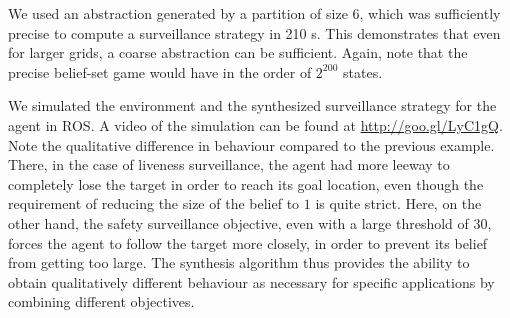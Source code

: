 We used an abstraction generated by a partition of size 6, which was sufficiently precise to compute a surveillance strategy in 210 s. This demonstrates that even for larger grids, a coarse abstraction can be sufficient. Again, note that the precise belief-set game would have in the order of $2^{200}$ states.
 
We simulated the environment and the synthesized surveillance strategy for the agent in ROS. A video of the simulation can be found at \url{http://goo.gl/LyC1gQ}. Note the qualitative difference in behaviour compared to the previous example. There, in the case of liveness surveillance, the agent had more leeway to completely lose the target in order to reach its goal location, even though the requirement of reducing the size of the belief to $1$ is quite strict. Here, on the other hand, the safety surveillance objective, even with a large threshold of $30$, forces the agent to follow the target more closely, in order to prevent its belief from getting too large. The synthesis algorithm thus provides the ability to obtain qualitatively different behaviour as necessary for specific applications by combining different objectives. 

